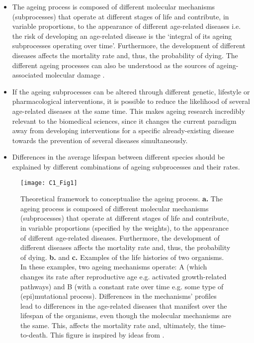 \begin{itemize}
	
	\item The ageing process is composed of different molecular mechanisms (subprocesses) that operate at different stages of life and contribute, in variable proportions, to the appearance of different age-related diseases i.e. the risk of developing an age-related disease is the `integral of its ageing subprocesses operating over time'. Furthermore, the development of different diseases affects the mortality rate and, thus, the probability of dying. The different ageing processes can also be understood as the sources of ageing-associated molecular damage \citep{Lopez-Otin2013}.
	
	\item If the ageing subprocesses can be altered through different genetic, lifestyle or pharmacological interventions, it is possible to reduce the likelihood of several age-related diseases at the same time. This makes ageing research incredibly relevant to the biomedical sciences, since it changes the current paradigm away from developing interventions for a specific already-existing disease towards the prevention of several diseases simultaneously.
	
	\item  Differences in the average lifespan between different species should be explained by different combinations of ageing subprocesses and their rates.
		
\end{itemize}	

\begin{figure}[htbp!] 
	\centering    
	\texttt{[image: C1\_Fig1]}
	\vspace*{1 mm}
	\caption[Theoretical framework to conceptualise the ageing process]{Theoretical framework to conceptualise the ageing process. \textbf{a.} The ageing process is composed of different molecular mechanisms (subprocesses) that operate at different stages of life and contribute, in variable proportions (specified by the weights), to the appearance of different age-related diseases. Furthermore, the development of different diseases affects the mortality rate and, thus, the probability of dying. \textbf{b.} and \textbf{c.} Examples of the life histories of two organisms. In these examples, two ageing mechanisms operate: A (which changes its rate after reproductive age e.g. activated growth-related pathways) and B (with a constant rate over time e.g. some type of (epi)mutational process). Differences in the mechanisms' profiles lead to differences in the age-related diseases that manifest over the lifespan of the organisms, even though the molecular mechanisms are the same. This, affects the mortality rate and, ultimately, the time-to-death. This figure is inspired by ideas from \citep{Hayflick2007,Gems2015,Peto1997,Stroustrup2016,Freund2019}.}
	\label{fig:c1_fig1}
\end{figure}

